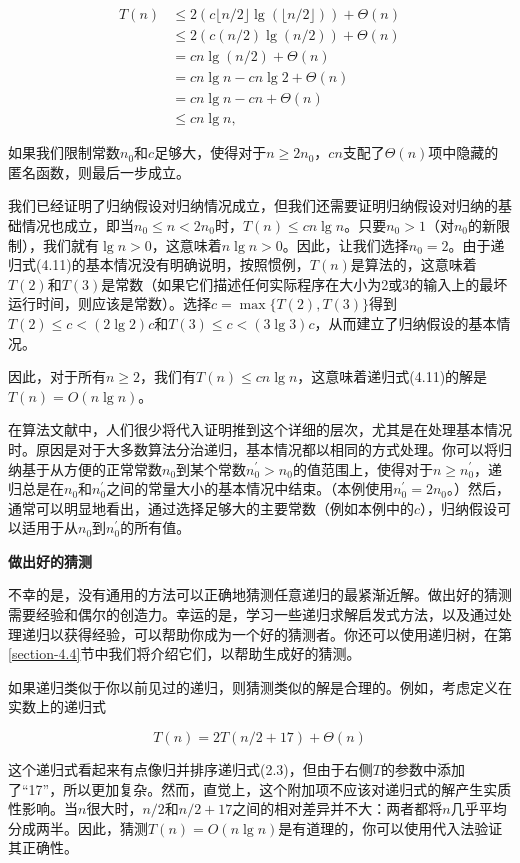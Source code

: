 \documentclass[lang=cn,newtx,10pt,scheme=chinese]{elegantbook}
\begin{document}
$$
\begin{aligned}
T(n) & \leq 2(c\lfloor n / 2\rfloor \lg (\lfloor n / 2\rfloor))+\Theta(n) \\
& \leq 2(c(n / 2) \lg (n / 2))+\Theta(n) \\
& =c n \lg (n / 2)+\Theta(n) \\
& =c n \lg n-c n \lg 2+\Theta(n) \\
& =c n \lg n-c n+\Theta(n) \\
& \leq c n \lg n,
\end{aligned}
$$

如果我们限制常数$n_0$和$c$足够大，使得对于$n \geq 2 n_0$，$c n$支配了$\Theta(n)$项中隐藏的匿名函数，则最后一步成立。

我们已经证明了归纳假设对归纳情况成立，但我们还需要证明归纳假设对归纳的基础情况也成立，即当$n_0 \leq n<2 n_0$时，$T(n) \leq c n \lg n$。只要$n_0>1$（对$n_0$的新限制），我们就有$\lg n>0$，这意味着$n \lg n>0$。因此，让我们选择$n_0=2$。由于递归式(4.11)的基本情况没有明确说明，按照惯例，$T(n)$是算法的，这意味着$T(2)$和$T(3)$是常数（如果它们描述任何实际程序在大小为2或3的输入上的最坏运行时间，则应该是常数）。选择$c=\max \{T(2), T(3)\}$得到$T(2) \leq c<(2 \lg 2) c$和$T(3) \leq c<(3 \lg 3) c$，从而建立了归纳假设的基本情况。

因此，对于所有$n \geq 2$，我们有$T(n) \leq c n \lg n$，这意味着递归式(4.11)的解是$T(n)=O(n \lg n)$。

在算法文献中，人们很少将代入证明推到这个详细的层次，尤其是在处理基本情况时。原因是对于大多数算法分治递归，基本情况都以相同的方式处理。你可以将归纳基于从方便的正常常数$n_0$到某个常数$n_0^{\prime}>n_0$的值范围上，使得对于$n \geq n_0^{\prime}$，递归总是在$n_0$和$n_0^{\prime}$之间的常量大小的基本情况中结束。（本例使用$n_0^{\prime}=2 n_0$。）然后，通常可以明显地看出，通过选择足够大的主要常数（例如本例中的$c$），归纳假设可以适用于从$n_0$到$n_0^{\prime}$的所有值。

\textbf{做出好的猜测}

不幸的是，没有通用的方法可以正确地猜测任意递归的最紧渐近解。做出好的猜测需要经验和偶尔的创造力。幸运的是，学习一些递归求解启发式方法，以及通过处理递归以获得经验，可以帮助你成为一个好的猜测者。你还可以使用递归树，在第\ref{section-4.4}节中我们将介绍它们，以帮助生成好的猜测。

如果递归类似于你以前见过的递归，则猜测类似的解是合理的。例如，考虑定义在实数上的递归式

$$
T(n)=2 T(n / 2+17)+\Theta(n)
$$

这个递归式看起来有点像归并排序递归式(2.3)，但由于右侧$T$的参数中添加了“17”，所以更加复杂。然而，直觉上，这个附加项不应该对递归式的解产生实质性影响。当$n$很大时，$n / 2$和$n / 2+17$之间的相对差异并不大：两者都将$n$几乎平均分成两半。因此，猜测$T(n)=O(n \lg n)$是有道理的，你可以使用代入法验证其正确性。
\end{document}
